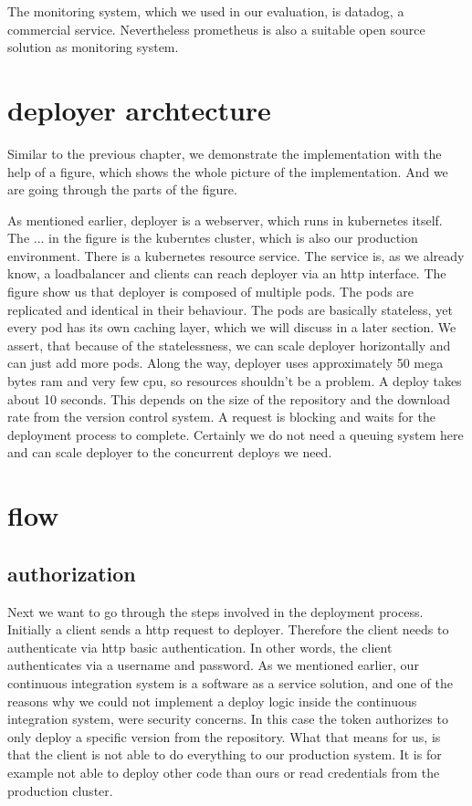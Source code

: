 The monitoring system, which we used in our evaluation, is datadog, a commercial
service. Nevertheless prometheus is also a suitable open source solution as monitoring
system.

\section{deployer archtecture}
Similar to the previous chapter, we demonstrate the implementation with the help of
a figure, which shows the whole picture of the implementation. And we are going through
the parts of the figure.

As mentioned earlier, deployer is a webserver, which runs in kubernetes itself. The ... in
the figure is the kuberntes cluster, which is also our production environment. There is a
kubernetes resource service. The service is, as we already know, a loadbalancer and
clients can reach deployer via an http interface. The figure show us that deployer is
composed of multiple pods. The pods are replicated and identical in their behaviour. The
pods are basically stateless, yet every pod has its own caching layer, which we will
discuss in a later section. We assert, that because of the statelessness, we can scale
deployer horizontally and can just add more pods. Along the way, deployer uses
approximately 50 mega bytes ram and very few cpu, so resources shouldn't be a problem. A
deploy takes about 10 seconds. This depends on the size of the repository and the download
rate from the version control system. A request is blocking and waits for the deployment
process to complete. Certainly we do not need a queuing system here and can scale deployer
to the concurrent deploys we need.

\section{flow}

\subsection{authorization}
Next we want to go through the steps involved in the deployment process. Initially a
client sends a http request to deployer. Therefore the client needs to authenticate via
http basic authentication. In other words, the client authenticates via a username and
password. As we mentioned earlier, our continuous integration system is a software as a
service solution, and one of the reasons why we could not implement a deploy logic inside
the continuous integration system, were security concerns. In this case the token
authorizes to only deploy a specific version from the repository. What that means for us,
is that the client is not able to do everything to our production system. It is for
example not able to deploy other code than ours or read credentials from the production
cluster.

